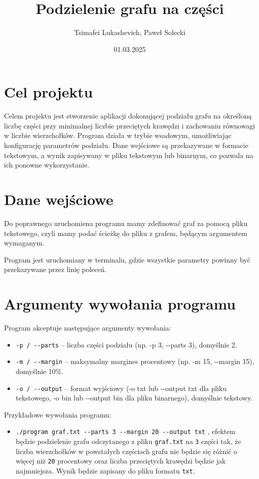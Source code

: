 \documentclass[]{article}
\title{Podzielenie grafu na części}
\author{Tsimafei Lukashevich, Paweł Solecki}
\date{01.03.2025}
\begin{document}
\maketitle

\section{Cel projektu}\label{header-n231}

Celem projektu jest stworzenie aplikacji dokonującej podziału grafu na określoną liczbę części przy minimalnej liczbie przeciętych krawędzi i zachowaniu równowagi w liczbie wierzchołków. Program działa w trybie wsadowym, umożliwiając konfigurację parametrów podziału. Dane wejściowe są przekazywane w formacie tekstowym, a wynik zapisywany w pliku tekstowym lub binarnym, co pozwala na ich ponowne wykorzystanie.

\section{Dane wejściowe}\label{header-n233}

Do poprawnego uruchomiena programu mamy zdefinować graf za pomocą pliku tekstowego, czyli mamy podać ścieżkę do pliku z grafem, będącym argumentem wymaganym.

Program jest uruchomiany w terminalu, gdzie wszystkie parametry powinny być przekazywane przez linię poleceń.

\section{Argumenty wywołania programu}\label{header-n256}

Program akceptuje następujące argumenty wywołania:

\begin{itemize}
\item
    \texttt{-p / -\/-parts} – liczba części podziału (np. -p 3, -\/-parts 3), domyślnie 2.
\item
    \texttt{-m / -\/-margin} – maksymalny margines procentowy (np. -m 15, -\/-margin 15), domyślnie 10\%.
\item
    \texttt{-o / -\/-output} – format wyjściowy (-o txt lub -\/-output txt dla pliku tekstowego, -o bin lub -\/-output bin dla pliku binarnego), domyślnie tekstowy.
\end{itemize}

Przykładowe wywołania programu:

\begin{itemize}
\item
  \texttt{./program\ graf.txt -\/-parts\ 3\ -\/-margin\ 20\ -\/-output\ txt}
  , efektem będzie podzielenie grafu odczytanego z pliku \texttt{graf.txt} na \texttt{3} części tak, że liczba wierzchołków w powstałych częściach grafu nie będzie się różnić o więcej niż \texttt{20} procentowy oraz liczba przeciętych krawędzi będzie jak najmniejsza. Wynik będzie zapisany do pliku formatu \texttt{txt}.
\end{itemize}
\end{document}
